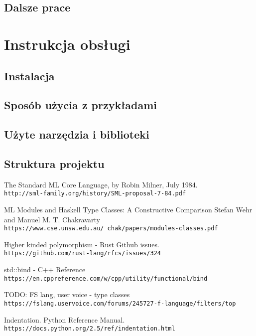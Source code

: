 \documentclass[declaration,shortabstract]{iithesis}
\begin{document}
\section{Dalsze prace}

\chapter{Instrukcja obsługi}

\section{Instalacja}

\section{Sposób użycia z przykładami}

\section{Użyte narzędzia i biblioteki}

\section{Struktura projektu}


\begin{thebibliography}{1}

The Standard ML Core Language, by Robin Milner, July 1984.
\\\texttt{http://sml-family.org/history/SML-proposal-7-84.pdf}

ML Modules and Haskell Type Classes:
A Constructive Comparison
Stefan Wehr and Manuel M. T. Chakravarty
\\\texttt{https://www.cse.unsw.edu.au/~chak/papers/modules-classes.pdf}

Higher kinded polymorphism - Rust Github issues.
\\\texttt{https://github.com/rust-lang/rfcs/issues/324}

std::bind - C++ Reference
\\\texttt{https://en.cppreference.com/w/cpp/utility/functional/bind}

TODO: FS lang, user voice - type classes
\\\texttt{https://fslang.uservoice.com/forums/245727-f-language/filters/top}

Indentation. Python Reference Manual.
\\\texttt{https://docs.python.org/2.5/ref/indentation.html}

\end{thebibliography}
\end{document}
